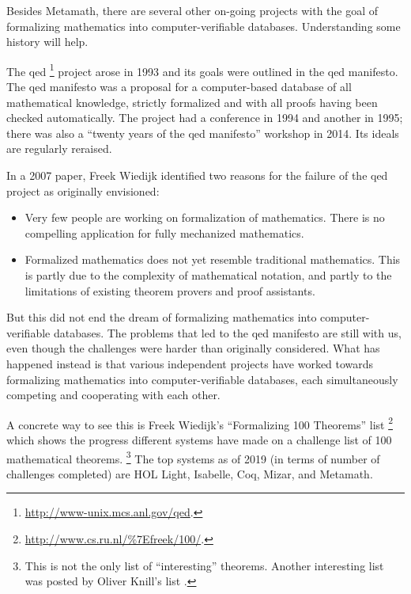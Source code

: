 Besides Metamath, there are several other on-going projects with the goal of
formalizing mathematics into computer-verifiable databases.
Understanding some history will help.

The {\sc qed}%
\footnote{\url{http://www-unix.mcs.anl.gov/qed}.}
project arose in 1993 and its goals were outlined in the
{\sc qed} manifesto.
The {\sc qed} manifesto was
a proposal for a computer-based database of all mathematical knowledge,
strictly formalized and with all proofs having been checked automatically.
The project had a conference in 1994 and another in 1995;
there was also a ``twenty years of the {\sc qed} manifesto'' workshop
in 2014.
Its ideals are regularly reraised.

In a 2007 paper, Freek Wiedijk identified two reasons
for the failure of the {\sc qed} project as originally envisioned:%
\cite{Wiedijk-revisited}

\begin{itemize}
\item Very few people are working on formalization of mathematics. There is no compelling application for fully mechanized mathematics.
\item Formalized mathematics does not yet resemble traditional mathematics. This is partly due to the complexity of mathematical notation, and partly to the limitations of existing theorem provers and proof assistants.
\end{itemize}

But this did not end the dream of
formalizing mathematics into computer-verifiable databases.
The problems that led to the {\sc qed} manifesto are still with us,
even though the challenges were harder than originally considered.
What has happened instead is that various independent projects have
worked towards formalizing mathematics into computer-verifiable databases,
each simultaneously competing and cooperating with each other.

A concrete way to see this is
Freek Wiedijk's ``Formalizing 100 Theorems'' list%
\footnote{\url{http://www.cs.ru.nl/\%7Efreek/100/}.}
which shows the progress different systems have made on a challenge list
of 100 mathematical theorems.%
\footnote{ This is not the only list of ``interesting'' theorems.
Another interesting list was posted by Oliver Knill's list
\cite{Knill}.}
The top systems as of 2019 (in terms of number of challenges completed) are
HOL Light, Isabelle, Coq, Mizar, and Metamath.

